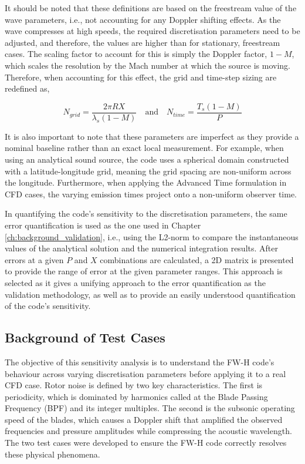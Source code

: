 It should be noted that these definitions are based on the freestream value of the wave parameters, i.e., not accounting for any Doppler shifting effects. As the wave compresses at high speeds, the required discretisation parameters need to be adjusted, and therefore, the values are higher than for stationary, freestream cases. The scaling factor to account for this is simply the Doppler factor, $1-M$, which scales the resolution by the Mach number at which the source is moving. Therefore, when accounting for this effect, the grid and time-step sizing are redefined as,

\begin{equation}
    N_{grid}=\frac{2\pi R X}{\lambda_s (1-M)}  \quad \text{and} \quad N_{time}= \frac{T_s(1-M)}{P} 
    \label{eq:doppler_PX}
\end{equation}

It is also important to note that these parameters are imperfect as they provide a nominal baseline rather than an exact local measurement. For example, when using an analytical sound source, the code uses a spherical domain constructed with a latitude-longitude grid, meaning the grid spacing are non-uniform across the longitude. Furthermore, when applying the Advanced Time formulation in CFD cases, the varying emission times project onto a non-uniform observer time.

In quantifying the code's sensitivity to the discretisation parameters, the same error quantification is used as the one used in Chapter \ref{ch:background_validation}, i.e., using the L2-norm to compare the instantaneous values of the analytical solution and the numerical integration results. After errors at a given $P$ and $X$ combinations are calculated, a 2D matrix is presented to provide the range of error at the given parameter ranges. This approach is selected as it gives a unifying approach to the error quantification as the validation methodology, as well as to provide an easily understood quantification of the code's sensitivity.

\subsection{Background of Test Cases} \label{subsec:sensitivity_background}

The objective of this sensitivity analysis is to understand the FW-H code's behaviour across varying discretisation parameters before applying it to a real CFD case. Rotor noise is defined by two key characteristics. The first is periodicity, which is dominated by harmonics called at the Blade Passing Frequency (BPF) and its integer multiples. The second is the subsonic operating speed of the blades, which causes a Doppler shift that amplified the observed frequencies and pressure amplitudes while compressing the acoustic wavelength. The two test cases were developed to ensure the FW-H code correctly resolves these physical phenomena.